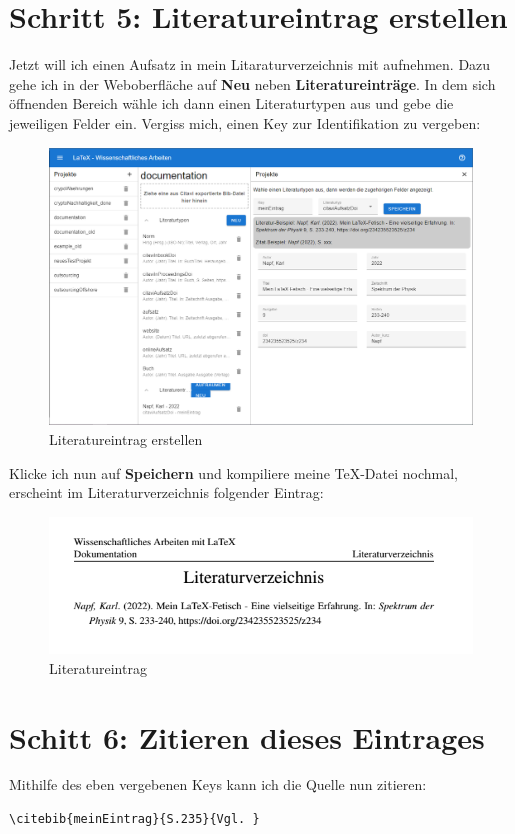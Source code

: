 \documentclass[12pt]{article}
\begin{document}
\section{Schritt 5: Literatureintrag erstellen}
Jetzt will ich einen Aufsatz in mein Litaraturverzeichnis mit aufnehmen. Dazu gehe ich in der Weboberfläche auf \textbf{Neu} neben \textbf{Literatureinträge}. In dem sich öffnenden Bereich wähle ich dann einen Literaturtypen aus und gebe die jeweiligen Felder ein. Vergiss mich, einen Key zur Identifikation zu vergeben:
\FloatBarrier
\begin{figure}[!ht]
\includegraphics[width=.9\textwidth]{images/screenshot_5.png}
\caption{Literatureintrag erstellen}
\end{figure}
\FloatBarrier
\noindent Klicke ich nun auf \textbf{Speichern} und kompiliere meine TeX-Datei nochmal, erscheint im Literaturverzeichnis folgender Eintrag:
\FloatBarrier
\begin{figure}[!ht]
\includegraphics[width=.9\textwidth]{images/screenshot_6.png}
\caption{Literatureintrag}
\end{figure}
\FloatBarrier
\section{Schitt 6: Zitieren dieses Eintrages}
Mithilfe des eben vergebenen Keys kann ich die Quelle nun zitieren:
\begin{verbatim}
\citebib{meinEintrag}{S.235}{Vgl. }
\end{verbatim}
\end{document}
